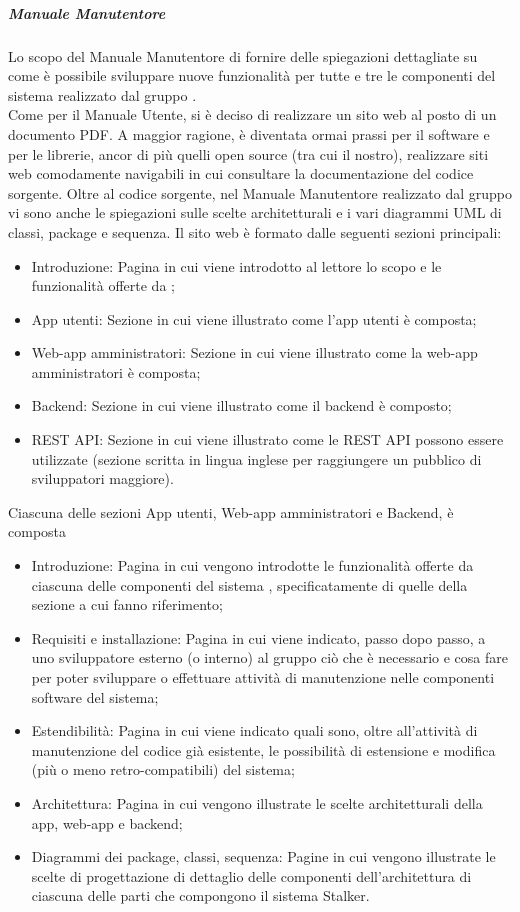 \subparagraph*{Manuale Manutentore}
Lo scopo del Manuale Manutentore di fornire delle spiegazioni dettagliate su come è possibile sviluppare nuove funzionalità per tutte e tre le componenti del sistema \NomeProgetto{} realizzato dal gruppo \Gruppo{}.\\
Come per il Manuale Utente, si è deciso di realizzare un sito web al posto di un documento PDF. A maggior ragione, è diventata ormai prassi per il software e per le librerie, ancor di più quelli open source (tra cui il nostro), realizzare siti web comodamente navigabili in cui consultare la documentazione del codice sorgente.
Oltre al codice sorgente, nel Manuale Manutentore realizzato dal gruppo vi sono anche le spiegazioni sulle scelte architetturali e i vari diagrammi UML di classi, package e sequenza.
Il sito web è formato dalle seguenti sezioni principali:
\begin{itemize}
    \item Introduzione: Pagina in cui viene introdotto al lettore lo scopo e le funzionalità offerte da \NomeProgetto{};
    \item App utenti: Sezione in cui viene illustrato come l'app utenti è composta;
    \item Web-app amministratori: Sezione in cui viene illustrato come la web-app amministratori è composta;
    \item Backend: Sezione in cui viene illustrato come il backend è composto;
    \item REST API: Sezione in cui viene illustrato come le REST API possono essere utilizzate (sezione scritta in lingua inglese per raggiungere un pubblico di sviluppatori maggiore).
\end{itemize}

Ciascuna delle sezioni App utenti, Web-app amministratori e Backend, è composta
\begin{itemize}
    \item Introduzione: Pagina in cui vengono introdotte le funzionalità offerte da ciascuna delle componenti del sistema \NomeProgetto{}, specificatamente di quelle della sezione a cui fanno riferimento;
    \item Requisiti e installazione: Pagina in cui viene indicato, passo dopo passo, a uno sviluppatore esterno (o interno) al gruppo ciò che è necessario e cosa fare per poter sviluppare o effettuare attività di manutenzione nelle componenti software del sistema;
    \item Estendibilità: Pagina in cui viene indicato quali sono, oltre all'attività di manutenzione del codice già esistente, le possibilità di estensione e modifica (più o meno retro-compatibili) del sistema;
    \item Architettura: Pagina in cui vengono illustrate le scelte architetturali della app, web-app e backend;
    \item Diagrammi dei package, classi, sequenza: Pagine in cui vengono illustrate le scelte di progettazione di dettaglio delle componenti dell'architettura di ciascuna delle parti che compongono il sistema Stalker.
\end{itemize}


